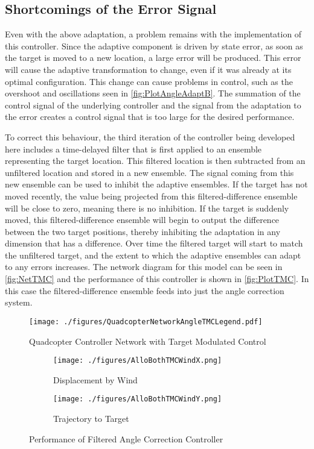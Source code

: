 \documentclass[letterpaper,12pt,titlepage,oneside,final]{book}
\begin{document}
\subsection{Shortcomings of the Error Signal}

Even with the above adaptation, a problem remains with the implementation of this controller. 
Since the adaptive component is driven by state error, as soon as the target is moved to a new location, a large error will be produced. 
This error will cause the adaptive transformation to change, even if it was already at its optimal configuration. 
This change can cause problems in control, such as the overshoot and oscillations seen in \autoref{fig:PlotAngleAdaptB}. 
The summation of the control signal of the underlying controller and the signal from the adaptation to the error creates a control signal that is too large for the desired performance.

To correct this behaviour, the third iteration of the controller being developed here includes a time-delayed filter that is first applied to an ensemble representing the target location. 
This filtered location is then subtracted from an unfiltered location and stored in a new ensemble. 
The signal coming from this new ensemble can be used to inhibit the adaptive ensembles. 
If the target has not moved recently, the value being projected from this filtered-difference ensemble will be close to zero, meaning there is no inhibition. 
If the target is suddenly moved, this filtered-difference ensemble will begin to output the difference between the two target positions, thereby inhibiting the adaptation in any dimension that has a difference. 
Over time the filtered target will start to match the unfiltered target, and the extent to which the adaptive ensembles can adapt to any errors increases. 
The network diagram for this model can be seen in \autoref{fig:NetTMC} and the performance of this controller is shown in \autoref{fig:PlotTMC}.
In this case the filtered-difference ensemble feeds into just the angle correction system.

\begin{figure}
\centering
\texttt{[image: ./figures/QuadcopterNetworkAngleTMCLegend.pdf]} %
\caption{Quadcopter Controller Network with Target Modulated Control}
\label{fig:NetTMC}
\end{figure}

\begin{figure}
\centering
\begin{subfigure}[t]{0.48\textwidth}
\texttt{[image: ./figures/AlloBothTMCWindX.png]} %
\caption{Displacement by Wind}
\end{subfigure}
\begin{subfigure}[t]{0.48\textwidth}
\texttt{[image: ./figures/AlloBothTMCWindY.png]}
\caption{Trajectory to Target}
\end{subfigure}
\caption{Performance of Filtered Angle Correction Controller}
\label{fig:PlotTMC}
\end{figure}
\end{document}
